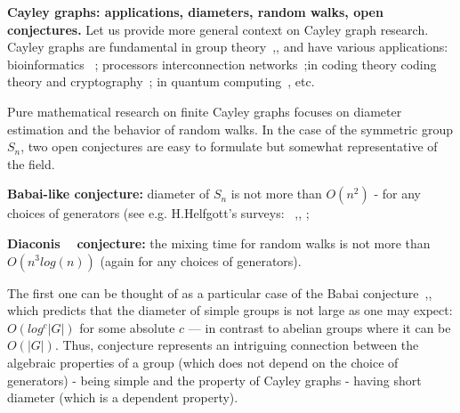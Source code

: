 \documentclass[atmp]{ipart_v1}
\numberwithin{equation}{section}
\theoremstyle{plain}%
\begin{document}
{\bf Cayley graphs: applications, diameters, random walks, open conjectures.}
Let us provide more general context on Cayley graph research.
Cayley graphs are fundamental in group theory~\cite{gromov1993geometric},\cite{tao2015expansion}, and have various applications: bioinformatics
~\cite{Pevzner1995human2mice, Pevzner1999cabbage2turnip, wilson2024cayley, bulteau2019parameterized}; processors interconnection networks~\cite{akers1989group, cooperman1991applications,heydemann1997cayley};in coding theory coding theory and cryptography~\cite{hoory2006expander,zemor1994hash,petit2013rubik}; in quantum computing~\cite{ruiz2024quantum,sarkar2024quantum,dinur2023good, acevedo2006exploring,gromada2022some}, etc.


Pure mathematical research on finite Cayley graphs focuses on diameter estimation and the behavior of random walks. In the case of the symmetric group $S_n$, two open conjectures are easy to formulate but somewhat representative of the field.  

{\bf Babai-like conjecture:} diameter of  $S_n$ is not more than $O(n^{2})$ - for any choices of generators (see e.g. H.Helfgott's surveys: ~\cite{helfgott2014diameter},\cite{helfgott2019growth},\cite{helfgott2015random} ; 

{\bf Diaconis ~\cite{diaconis2013some} conjecture:}  the mixing time for random walks is not more than $O(n^{3}log(n))$ (again for any choices of generators). 

The first one can be thought of as a particular case of the Babai conjecture~\cite{babai1992diameter},\cite{tao2015expansion}, which predicts that the diameter of simple groups is not large as one may expect: $O(log^c|G|)$ for some absolute $c$ --- in contrast to abelian groups where it can be $O(|G|)$. Thus, conjecture represents an intriguing connection between the algebraic properties of a group (which does not depend on the choice of generators) - being simple and the property of Cayley graphs - having short diameter (which is a dependent property). 



\end{document}
